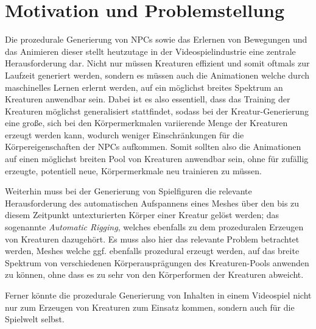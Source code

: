 \section{Motivation und Problemstellung}

Die prozedurale Generierung von NPCs sowie das Erlernen von Bewegungen und das Animieren dieser stellt heutzutage in der Videospielindustrie eine zentrale Herausforderung dar. Nicht nur müssen Kreaturen effizient und somit oftmals zur Laufzeit generiert werden, sondern es müssen auch die Animationen welche durch maschinelles Lernen erlernt werden, auf ein möglichst breites Spektrum an Kreaturen anwendbar sein. Dabei ist es also essentiell, dass das Training der Kreaturen möglichst generalisiert stattfindet, sodass bei der Kreatur-Generierung eine große, sich bei den Körpermerkmalen variierende Menge der Kreaturen erzeugt werden kann, wodurch weniger Einschränkungen für die Körpereigenschaften der NPCs aufkommen. Somit sollten also die Animationen auf einen möglichst breiten Pool von Kreaturen anwendbar sein, ohne für zufällig erzeugte, potentiell neue, Körpermerkmale neu trainieren zu müssen.

Weiterhin muss bei der Generierung von Spielfiguren die relevante Herausforderung des automatischen Aufspannens eines Meshes über den bis zu diesem Zeitpunkt untexturierten Körper einer Kreatur gelöst werden; das sogenannte \textit{Automatic Rigging}, welches ebenfalls zu dem prozeduralen Erzeugen von Kreaturen dazugehört. Es muss also hier das relevante Problem betrachtet werden, Meshes welche ggf. ebenfalls prozedural erzeugt werden, auf das breite Spektrum von verschiedenen Körperausprägungen des Kreaturen-Pools anwenden zu können, ohne dass es zu sehr von den Körperformen der Kreaturen abweicht.

Ferner könnte die prozedurale Generierung von Inhalten in einem Videospiel nicht nur zum Erzeugen von Kreaturen zum Einsatz kommen, sondern auch für die Spielwelt selbst. %

